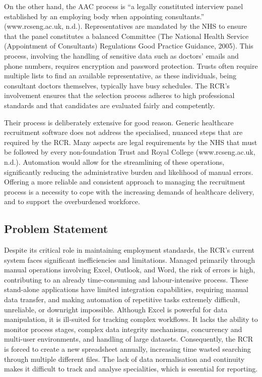 \begin{multicols}{2}
On the other hand, the AAC process is “a legally constituted interview panel established by an employing body when appointing consultants.” (www.rcseng.ac.uk, n.d.). Representatives are mandated by the NHS to ensure that the panel constitutes a balanced Committee (The National Health Service (Appointment of Consultants) Regulations Good Practice Guidance, 2005). This process, involving the handling of sensitive data such as doctors' emails and phone numbers, requires encryption and password protection. Trusts often require multiple lists to find an available representative, as these individuals, being consultant doctors themselves, typically have busy schedules. The RCR’s involvement ensures that the selection process adheres to high professional standards and that candidates are evaluated fairly and competently.

Their process is deliberately extensive for good reason. Generic healthcare recruitment software does not address the specialised, nuanced steps that are required by the RCR. Many aspects are legal requirements by the NHS that must be followed by every non-foundation Trust and Royal College (www.rcseng.ac.uk, n.d.). Automation would allow for the streamlining of these operations, significantly reducing the administrative burden and likelihood of manual errors. Offering a more reliable and consistent approach to managing the recruitment process is a necessity to cope with the increasing demands of healthcare delivery, and to support the overburdened workforce.
\subsection{Problem Statement}
Despite its critical role in maintaining employment standards, the RCR's current system faces significant inefficiencies and limitations. Managed primarily through manual operations involving Excel, Outlook, and Word, the risk of errors is high, contributing to an already time-consuming and labour-intensive process. These stand-alone applications have limited integration capabilities, requiring manual data transfer, and making automation of repetitive tasks extremely difficult, unreliable, or downright impossible. Although Excel is powerful for data manipulation, it is ill-suited for tracking complex workflows. It lacks the ability to monitor process stages, complex data integrity mechanisms, concurrency and multi-user environments, and handling of large datasets. Consequently, the RCR is forced to create a new spreadsheet annually, increasing time wasted searching through multiple different files. The lack of data normalisation and continuity makes it difficult to track and analyse specialities, which is essential for reporting.


\end{multicols}
